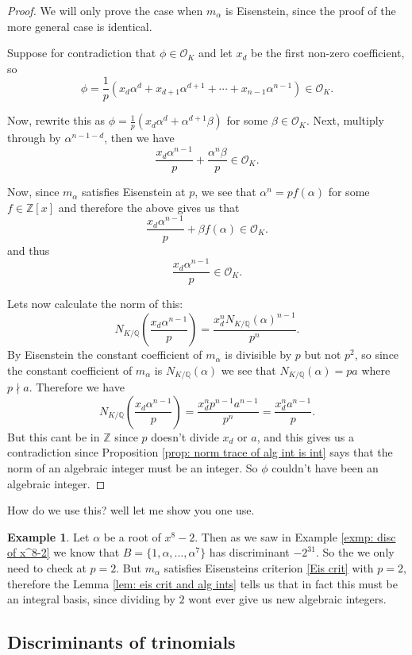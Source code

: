\documentclass[11pt,a4paper]{report}
\theoremstyle{plain}
\theoremstyle{definition}
\newtheorem{exmp}[subsection]{Example}
\theoremstyle{definition}
\newcommand{\ZZ}{\mathbb{Z}}
\def\QQ{\mathbb{Q}}
\def \a{\alpha}
\def \OO {\mathcal{O}}
\begin{document}
	
	\begin{proof}
		We will only prove the case when $m_\a$ is Eisenstein, since the proof of the more general case is identical.	
		
		Suppose for contradiction that $\phi \in \OO_K$ and let $x_d$ be the first non-zero coefficient, so \[\phi=\frac{1}{p}(x_d\a^d+x_{d+1}\a^{d+1}+\cdots+x_{n-1}\a^{n-1}) \in \OO_K.\]
		
		Now, rewrite this as $\phi=\frac{1}{p}(x_d\a^d +\a^{d+1}\beta)$ for some $\beta \in \OO_K$. Next, multiply through by $\a^{n-1-d}$, then we have \[\frac{x_d\a^{n-1}}{p}+\frac{\a^n\beta}{p} \in \OO_K.\]
		
		Now, since  $m_\a$ satisfies Eisenstein at $p$, we see that $\a^n=pf(\a)$ for some $f \in \ZZ[x]$ and therefore the above gives us that \[\frac{x_d\a^{n-1}}{p}+\beta f(\a) \in \OO_K.\] and thus \[\frac{x_d\a^{n-1}}{p} \in \OO_K.\]
		
		Lets now calculate the norm of this: \[N_{K/\QQ} \left(\frac{x_d\a^{n-1}}{p} \right)=\frac{x_d^n N_{K/\QQ}(\a)^{n-1}}{p^n}.\] By Eisenstein the constant coefficient of $m_\a$ is divisible by $p$ but not $p^2$, so since the constant coefficient of $m_\a$ is $N_{K/\QQ}(\a)$ we see that $N_{K/\QQ}(\a)=p a$ where $p \nmid a$. Therefore we have \[N_{K/\QQ} \left(\frac{x_d\a^{n-1}}{p} \right)=\frac{x_d^n p^{n-1}a^{n-1}}{p^n}= \frac{x_d^n a^{n-1}}{p}.\] But this cant be in $\ZZ$ since $p$ doesn't divide $x_d$ or $a$, and this gives us a contradiction since  Proposition \ref{prop: norm trace of alg int is int} says that the norm of an algebraic integer must be an integer. So $\phi$ couldn't have been an algebraic integer. 
		
		
	\end{proof}
	
	How do we use this? well let me show you one use.
	
	\begin{exmp}
		Let $\a$ be a root of $x^8-2$. Then as we saw in Example \ref{exmp: disc of x^8-2} we know that $B=\{1,\a,\dots,\a^7\}$ has discriminant $-2^{31}$. So the we only need to check at $p=2$. But $m_\a$ satisfies Eisensteins criterion \ref{Eis crit} with $p=2$, therefore the Lemma \ref{lem: eis crit and alg ints} tells us that in fact this must be an integral basis, since dividing by $2$ wont ever give us new algebraic integers.
	\end{exmp}
	
	
	\subsection{Discriminants of trinomials}
	
\end{document}
